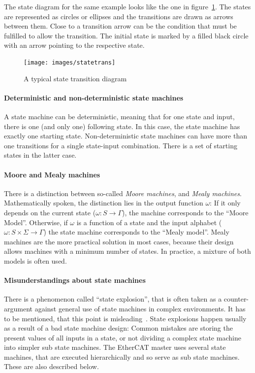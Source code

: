 \documentclass[a4paper,12pt,BCOR6mm,bibtotoc,idxtotoc]{scrbook}
\begin{document}
The state diagram for the same example looks like the one in
figure~\ref{fig:statetrans}. The states are represented as circles or
ellipses and the transitions are drawn as arrows between them. Close
to a transition arrow can be the condition that must be fulfilled to
allow the transition. The initial state is marked by a filled black
circle with an arrow pointing to the respective state.

\begin{figure}[htbp]
  \centering
  \texttt{[image: images/statetrans]}
  \caption{A typical state transition diagram}
  \label{fig:statetrans}
\end{figure}

\paragraph{Deterministic and non-deterministic state machines}

A state machine can be deterministic, meaning that for one state and
input, there is one (and only one) following state. In this case, the
state machine has exactly one starting state. Non-deterministic state
machines can have more than one transitions for a single state-input
combination. There is a set of starting states in the latter case.

\paragraph{Moore and Mealy machines}

There is a distinction between so-called \textit{Moore machines}, and
\textit{Mealy machines}. Mathematically spoken, the distinction lies
in the output function $\omega$: If it only depends on the current
state ($\omega: S \rightarrow \Gamma$), the machine corresponds to the
``Moore Model''. Otherwise, if $\omega$ is a function of a state and
the input alphabet ($\omega: S \times \Sigma \rightarrow \Gamma$) the
state machine corresponds to the ``Mealy model''. Mealy machines are
the more practical solution in most cases, because their design allows
machines with a minimum number of states. In practice, a mixture of
both models is often used.

\paragraph{Misunderstandings about state machines}

There is a phenomenon called ``state explosion'', that is often taken as a
counter-argument against general use of state machines in complex environments.
It has to be mentioned, that this point is misleading~\cite{fsmmis}. State
explosions happen usually as a result of a bad state machine design: Common
mistakes are storing the present values of all inputs in a state, or not
dividing a complex state machine into simpler sub state machines. The EtherCAT
master uses several state machines, that are executed hierarchically and so
serve as sub state machines. These are also described below.
\end{document}
